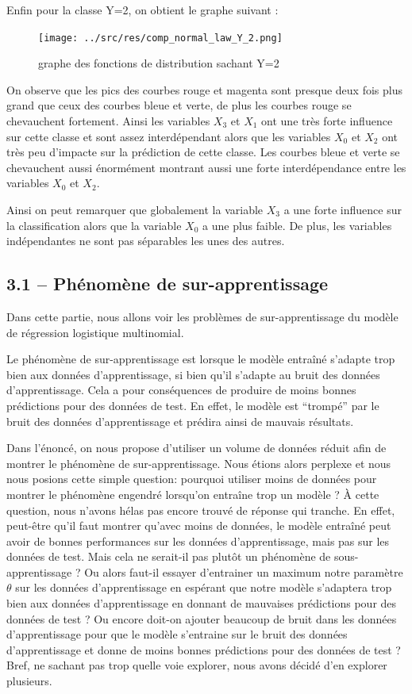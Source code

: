 \documentclass[
]{article}
\begin{document}
\newpage{}

Enfin pour la classe Y=2, on obtient le graphe suivant :

\begin{figure}
\centering
\texttt{[image: ../src/res/comp\_normal\_law\_Y\_2.png]}
\caption{graphe des fonctions de distribution sachant Y=2}
\end{figure}

On observe que les pics des courbes rouge et magenta sont presque deux
fois plus grand que ceux des courbes bleue et verte, de plus les courbes
rouge se chevauchent fortement. Ainsi les variables \(X_3\) et \(X_1\)
ont une très forte influence sur cette classe et sont assez
interdépendant alors que les variables \(X_0\) et \(X_2\) ont très peu
d'impacte sur la prédiction de cette classe. Les courbes bleue et verte
se chevauchent aussi énormément montrant aussi une forte interdépendance
entre les variables \(X_0\) et \(X_2\).

Ainsi on peut remarquer que globalement la variable \(X_3\) a une forte
influence sur la classification alors que la variable \(X_0\) a une plus
faible. De plus, les variables indépendantes ne sont pas séparables les
unes des autres.

\subsection{3.1 -- Phénomène de
sur-apprentissage}\label{phuxe9nomuxe8ne-de-sur-apprentissage}

Dans cette partie, nous allons voir les problèmes de sur-apprentissage
du modèle de régression logistique multinomial.

Le phénomène de sur-apprentissage est lorsque le modèle entraîné
s'adapte trop bien aux données d'apprentissage, si bien qu'il s'adapte
au bruit des données d'apprentissage. Cela a pour conséquences de
produire de moins bonnes prédictions pour des données de test. En effet,
le modèle est ``trompé'' par le bruit des données d'apprentissage et
prédira ainsi de mauvais résultats.

Dans l'énoncé, on nous propose d'utiliser un volume de données réduit
afin de montrer le phénomène de sur-apprentissage. Nous étions alors
perplexe et nous nous posions cette simple question: pourquoi utiliser
moins de données pour montrer le phénomène engendré lorsqu'on entraîne
trop un modèle ? À cette question, nous n'avons hélas pas encore trouvé
de réponse qui tranche. En effet, peut-être qu'il faut montrer qu'avec
moins de données, le modèle entraîné peut avoir de bonnes performances
sur les données d'apprentissage, mais pas sur les données de test. Mais
cela ne serait-il pas plutôt un phénomène de sous-apprentissage ? Ou
alors faut-il essayer d'entrainer un maximum notre paramètre \(\theta\)
sur les données d'apprentissage en espérant que notre modèle s'adaptera
trop bien aux données d'apprentissage en donnant de mauvaises
prédictions pour des données de test ? Ou encore doit-on ajouter
beaucoup de bruit dans les données d'apprentissage pour que le modèle
s'entraine sur le bruit des données d'apprentissage et donne de moins
bonnes prédictions pour des données de test ? Bref, ne sachant pas trop
quelle voie explorer, nous avons décidé d'en explorer plusieurs.
\end{document}
